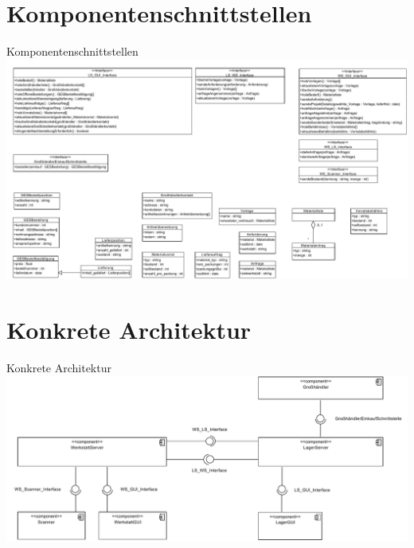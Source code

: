 \documentclass{beamer}
\begin{document}
	\section{Komponentenschnittstellen}
	\begin{frame}{Komponentenschnittstellen}
		\includegraphics[width=\textwidth]{PDF/Schnittstellen.pdf}
	\end{frame}
	\section{Konkrete Architektur}
	\begin{frame}{Konkrete Architektur}
		\includegraphics[width=\textwidth]{PDF/Konkrete_Architektur.pdf}
	\end{frame}
\end{document}
